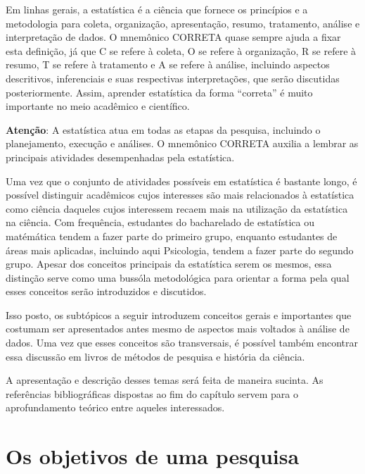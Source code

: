 \documentclass[
]{book}
\begin{document}
Em linhas gerais, a estatística é a ciência que fornece os princípios e
a metodologia para coleta, organização, apresentação, resumo,
tratamento, análise e interpretação de dados. O mnemônico CORRETA quase
sempre ajuda a fixar esta definição, já que C se refere à coleta, O se
refere à organização, R se refere à resumo, T se refere à tratamento e A
se refere à análise, incluindo aspectos descritivos, inferenciais e suas
respectivas interpretações, que serão discutidas posteriormente. Assim,
aprender estatística da forma ``correta'' é muito importante no meio
acadêmico e científico.

\begin{warning}

\textbf{Atenção}: A estatística atua em todas as etapas da pesquisa,
incluindo o planejamento, execução e análises. O mnemônico CORRETA
auxilia a lembrar as principais atividades desempenhadas pela
estatística.

\end{warning}

Uma vez que o conjunto de atividades possíveis em estatística é bastante
longo, é possível distinguir acadêmicos cujos interesses são mais
relacionados à estatística como ciência daqueles cujos interessem recaem
mais na utilização da estatística na ciência. Com frequência, estudantes
do bacharelado de estatística ou matémática tendem a fazer parte do
primeiro grupo, enquanto estudantes de áreas mais aplicadas, incluindo
aqui Psicologia, tendem a fazer parte do segundo grupo. Apesar dos
conceitos principais da estatística serem os mesmos, essa distinção
serve como uma bussóla metodológica para orientar a forma pela qual
esses conceitos serão introduzidos e discutidos.

Isso posto, os subtópicos a seguir introduzem conceitos gerais e
importantes que costumam ser apresentados antes mesmo de aspectos mais
voltados à análise de dados. Uma vez que esses conceitos são
transversais, é possível também encontrar essa discussão em livros de
métodos de pesquisa e história da ciência.

A apresentação e descrição desses temas será feita de maneira sucinta.
As referências bibliográficas dispostas ao fim do capítulo servem para o
aprofundamento teórico entre aqueles interessados.

\hypertarget{os-objetivos-de-uma-pesquisa}{%
\section{Os objetivos de uma
pesquisa}\label{os-objetivos-de-uma-pesquisa}}
\end{document}
